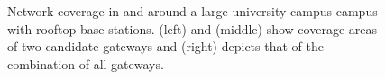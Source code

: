 \begin{figure}[!bt]
\centering
{} \hfill
{} \hfill
{} \hfill
{}
\compactimg
\caption{Network coverage in and around a large university campus campus with rooftop base stations.  (left) and (middle) show coverage areas of two candidate gateways and (right) depicts that of the combination of all gateways.}
\label{fig:wardrive}
\compactimg
\end{figure}


